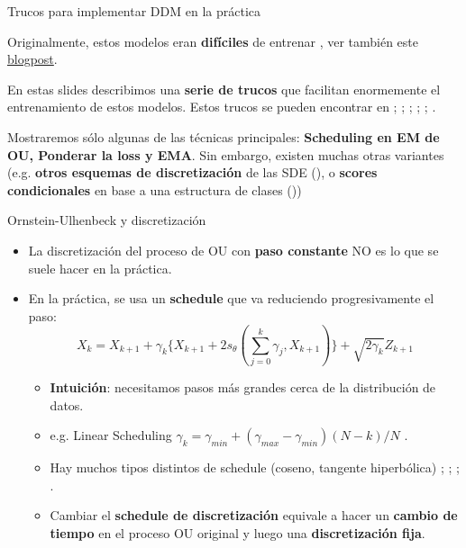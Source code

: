 \documentclass[aspectratio=169,xcolor=dvipsnames, t, spanish]{beamer}
\begin{document}
    
    \begin{frame}{Trucos para implementar DDM en la práctica}\vspace{-6mm}
    \begin{center}
        Originalmente, estos modelos eran \textbf{difíciles} de entrenar \citet{SongErmon2019}, ver también este \href{https://yang-song.github.io/blog/2021/score/}{blogpost}. 
    \end{center}
    \pause
    \begin{center}
        En estas slides describimos una \textbf{serie de trucos} que facilitan enormemente el entrenamiento de estos modelos. Estos trucos se pueden encontrar en \citet{Song2020b}; \citet{SongErmon2020}; \citet{NicholDhariwal2021}; \citet{HoSalimans2021}; \citet{DeBortoli2021a}; \citet{Karras2022}.
    \end{center}
    \pause
    \begin{center}
        Mostraremos sólo algunas de las técnicas principales: \textbf{Scheduling en EM de OU, Ponderar la loss y EMA}. Sin embargo, existen muchas otras variantes (e.g. \textbf{otros esquemas de discretización} de las SDE (\cite{DurhamGallant2002, DeBortoli2021a}), o \textbf{scores condicionales} en base a una estructura de clases (\cite{Song2020b, HoSalimans2021, DhariwalNichol2021}))
    \end{center}
    \end{frame}
    
    \begin{frame}{Ornstein-Ulhenbeck y discretización}
        \begin{itemize}
            \item La discretización del proceso de OU con \textbf{paso constante} NO es lo que se suele hacer en la práctica.
            \item En la práctica, se usa un \textbf{schedule} que va reduciendo progresivamente el paso:
            \[ X_{k}=X_{k+1}+\gamma_{k}\{X_{k+1}+2s_{\theta}(\sum_{j=0}^{k}\gamma_{j},X_{k+1})\}+\sqrt{2\gamma_{k}}Z_{k+1} \]
            \begin{itemize}
            \pause
                \item \textbf{Intuición}: necesitamos pasos más grandes cerca de la distribución de datos.
                \item e.g. Linear Scheduling $\gamma_{k}=\gamma_{min}+(\gamma_{max}-\gamma_{min})(N-k)/N$ \cite{Song2020b}.
                \item Hay muchos tipos distintos de schedule (coseno, tangente hiperbólica) \citet{SongErmon2019}; \citet{Ho2020}; \citet{NicholDhariwal2021}; \citet{Karras2022}.
                \item Cambiar el \textbf{schedule de discretización} equivale a hacer un \textbf{cambio de tiempo} en el proceso OU original y luego una \textbf{discretización fija}.
            \end{itemize}
        \end{itemize}
    \end{frame}
    
\end{document}
